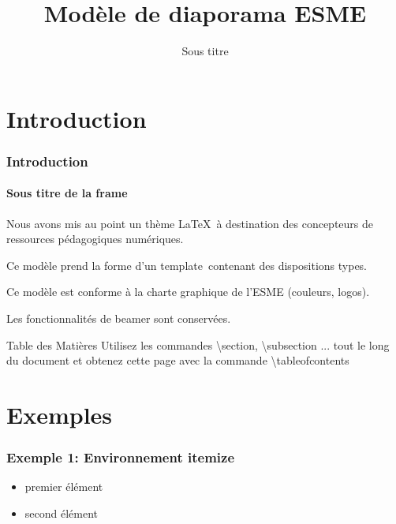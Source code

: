 \documentclass[aspectratio=169]{beamer}
\title{Modèle de diaporama ESME}
\subtitle{Sous titre}
\date[]{}
\author[]{}
\begin{document}
\begin{frame}
\titlepage
\end{frame}

\section{Introduction}


\begin{frame} 
\frametitle{Introduction} 
\framesubtitle{Sous titre de la frame} 

Nous avons mis au point un thème \LaTeX~à destination des concepteurs de 
ressources pédagogiques numériques.\newline

Ce modèle prend la forme d'un \og template\fg~contenant des 
dispositions types.\newline

Ce modèle est conforme à la charte graphique de l'ESME (couleurs, logos).\newline

Les fonctionnalités de beamer sont conservées.

\end{frame}

\begin{frame}{Table des Matières}
    \tableofcontents
    \scriptsize
    Utilisez les commandes \textbackslash section, \textbackslash subsection ...
    tout le long du document et obtenez cette page avec la commande 
    \textbackslash tableofcontents
\end{frame}

\section{Exemples}

\begin{frame}
    \frametitle{Exemple 1: Environnement itemize}
\begin{itemize}
    \item premier élément 
    \item second élément
\end{itemize}
\end{frame}
\end{document}
